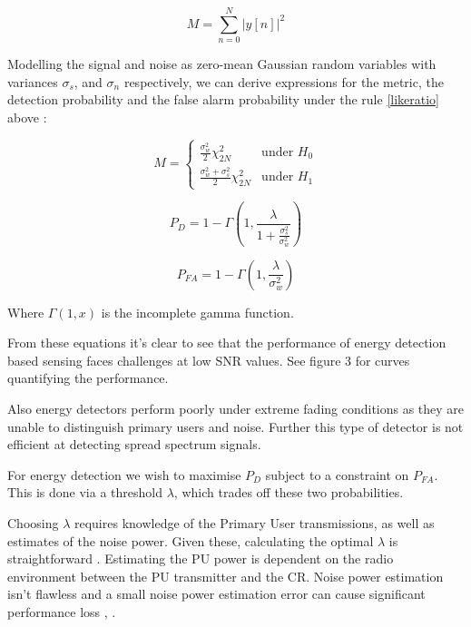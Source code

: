 \begin{equation}
M = \sum_{n=0}^N |y\left[n\right]|^2
\end{equation}

\begin{theorem}
Modelling the signal and noise as zero-mean Gaussian random variables with variances \(\sigma_s\), and \(\sigma_n\) respectively, we can derive expressions for the metric, the detection probability and the false alarm probability under the rule \eqref{likeratio} above \cite{yucek2009survey}:

\begin{equation}
 M =
  \begin{cases}
   \frac{\sigma_w^2}{2} \chi^2_{2N} & \text{under }H_0 \\
   \frac{\sigma_w^2 + \sigma_s^2}{2} \chi^2_{2N} & \text{under } H_1
  \end{cases}
\end{equation}

\begin{equation}
P_D = 1 - \Gamma\left(1, \frac{\lambda}{1 + \frac{ \sigma_s^2 }{ \sigma_w^2 } } \right)
\end{equation}

\begin{equation}
P_{FA} = 1 - \Gamma\left(1, \frac{\lambda}{\sigma_w^2} \right)
\end{equation}

Where \( \Gamma\left(1,x\right)\) is the incomplete gamma function. 
\end{theorem}

From these equations it's clear to see that the performance of energy detection based sensing faces challenges at low SNR values. See \cite{yucek2009survey} figure 3 for curves quantifying the performance. 

Also energy detectors perform poorly under extreme fading conditions as they are unable to distinguish primary users and noise. Further this type of detector is not efficient at detecting spread spectrum signals. 

For energy detection we wish to maximise \(P_D\) subject to a constraint on \(P_{FA}\). This is done via a threshold \(\lambda\), which trades off these two probabilities.

Choosing \(\lambda\) requires knowledge of the Primary User transmissions, as well as estimates of the noise power. Given these, calculating the optimal \(\lambda\) is straightforward \cite{xie2009optimal}. Estimating the PU power is dependent on the radio environment between the PU transmitter and the CR. Noise power estimation isn't flawless and a small noise power estimation error can cause significant performance loss \cite{hamdi2010impact}, \cite{sahai2004some}.

